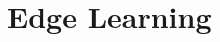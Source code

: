 \documentclass[../mthe-493-final-project.tex]{subfiles}
\begin{document}
    \chapter{Edge Learning}
    \label{ch:edge-learning}
\end{document}
